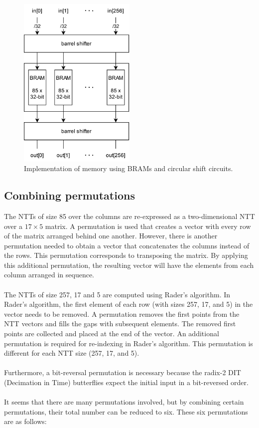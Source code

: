 \documentclass[english,master=eelt,masteroption=ec]{kulemt}
\begin{document}
\begin{figure}[h]
\centering
\includegraphics[width=0.5\textwidth]{img/mem_design.png}
\caption{Implementation of memory using BRAMs and circular shift circuits.}
\label{fig:mem_design}
\end{figure}

\FloatBarrier

\subsection{Combining permutations}
The NTTs of size 85 over the columns are re-expressed as a two-dimensional NTT over a $17\times 5$ matrix. A permutation is used that creates a vector with every row of the matrix arranged behind one another. However, there is another permutation needed to obtain a vector that concatenates the columns instead of the rows. This permutation corresponds to transposing the matrix. By applying this additional permutation, the resulting vector will have the elements from each column arranged in sequence.
\\\\
The NTTs of size 257, 17 and 5 are computed using Rader's algorithm. In Rader's algorithm, the first element of each row (with sizes 257, 17, and 5) in the vector needs to be removed. A permutation removes the first points from the NTT vectors and fills the gaps with subsequent elements. The removed first points are collected and placed at the end of the vector. An additional permutation is required for re-indexing in Rader's algorithm. This permutation is different for each NTT size (257, 17, and 5).
\\\\
Furthermore, a bit-reversal permutation is necessary because the radix-2 DIT (Decimation in Time) butterflies expect the initial input in a bit-reversed order.
\\\\
It seems that there are many permutations involved, but by combining certain permutations, their total number can be reduced to six. These six permutations are as follows:
\end{document}
